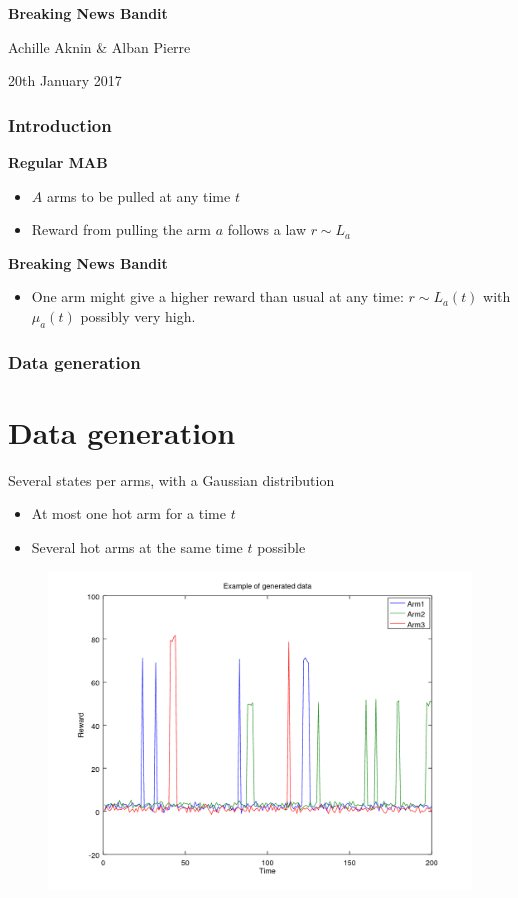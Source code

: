 \documentclass[french]{beamer}
\begin{document}
		\begin{frame}
		\begin{center}
		\Large{\textbf{Breaking News Bandit}}
		\vspace{20pt}
		\end{center}

	\begin{center}
	Achille Aknin \& Alban Pierre

	20th January 2017
	\end{center}
		\end{frame}

	\begin{frame}
		\frametitle{Introduction}
		\textbf{Regular MAB}
		\begin{itemize}
			\item $A$ arms to be pulled at any time $t$
			\item Reward from pulling the arm $a$ follows a law $r \sim L_a$
		\end{itemize}
		\textbf{Breaking News Bandit}
		\begin{itemize}
			\item One arm might give a higher reward than usual at any time: $r \sim L_a(t)$
			with $\mu_a(t)$ possibly very high.
		\end{itemize}
	\end{frame}

	\begin{frame}

		\tableofcontents[]
	\end{frame}


	\begin{frame}
	\frametitle{Data generation}
	\section{Data generation}
	Several states per arms, with a Gaussian distribution
	\begin{itemize}
		\item At most one hot arm for a time $t$
		\item Several hot arms at the same time $t$ possible
	\end{itemize}

	\begin{figure}[h]
			\includegraphics[width=0.7\linewidth]{generated_data_one.png}

		\label{fig:f}
	\end{figure}


\end{frame}
\end{document}
